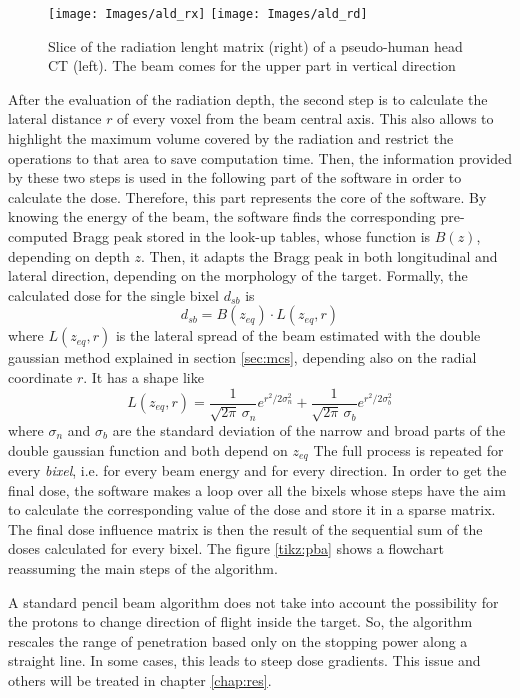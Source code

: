 \documentclass[12pt, a4paper, twoside]{book}
\begin{document}
\begin{figure}[!t]
\centering
\texttt{[image: Images/ald\_rx]}
\texttt{[image: Images/ald\_rd]}
\caption{Slice of the radiation lenght matrix (right) of a pseudo-human head CT (left). The beam comes for the upper part in vertical direction}
\label{fig:rd}
\end{figure}
After the evaluation of the radiation depth, the second step is to calculate the lateral distance  $r$ of every voxel from the beam central axis. This also allows to highlight the maximum volume covered by the radiation and restrict the operations to that area to save computation time. 
Then, the information provided by these two steps is used in the following part of the software in order to calculate the dose. Therefore, this part represents the core of the software. By knowing the energy of the beam, the software finds the corresponding pre-computed Bragg peak stored in the look-up tables, whose function is $B(z)$, depending on depth $z$. Then, it adapts the Bragg peak in both longitudinal and lateral direction, depending on the morphology of the target. 
Formally, the calculated dose for the single bixel $d_{sb}$ is 	
\[
d_{sb} = B(z_{eq}) \cdot L(z_{eq},r)
\]
where $L(z_{eq},r)$ is the lateral spread of the beam estimated with the double gaussian method explained in section \ref{sec:mcs}, depending also on the radial coordinate $r$. It has a shape like
\[
L(z_{eq},r) = \frac{1}{\sqrt{2\pi}\,\sigma_n}e^{r^2/2\sigma_n^2} + \frac{1}{\sqrt{2\pi}\,\sigma_b}e^{r^2/2\sigma_b^2} 
\]
where $\sigma_n$ and $\sigma_b$ are the standard deviation of the narrow and broad parts of the double gaussian function and both depend on $z_{eq}$
The full process is repeated for every \emph{bixel}, i.e. for every beam energy and for every direction. In order to get the final dose, the software makes a loop over all the bixels whose steps have the aim to calculate the corresponding value of the dose and store it in a sparse matrix. The final dose influence matrix is then the result of the sequential sum of the doses calculated for every bixel.
The figure \ref{tikz:pba} shows a flowchart reassuming the main steps of the algorithm.

A standard pencil beam algorithm does not take into account the possibility for the protons to change direction of flight inside the target. So, the algorithm rescales the range of penetration based only on the stopping power along a straight line. In some cases, this leads to steep dose gradients. This issue and others will be treated in chapter \ref{chap:res}.
\end{document}
